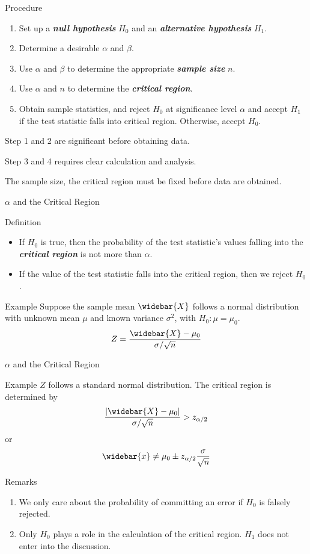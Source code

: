 \documentclass{beamer}
\newcommand{\bb}[1]{\textcolor{antiquefuchsia}{\textbf{\textit{#1}}}}
\begin{document}
\begin{frame}{Procedure}
\begin{enumerate}
\item Set up a \bb{null hypothesis} $H_{0}$ and an \bb{alternative hypothesis} $H_{1}$.
\item Determine a desirable $\alpha$ and $\beta$.
\item Use $\alpha$ and $\beta$ to determine the appropriate \bb{sample size} $n$.
\item Use $\alpha$ and $n$ to determine the \bb{critical region}.
\item Obtain sample statistics, and reject $H_{0}$ at significance level $\alpha$ and accept $H_{1}$ if the test statistic falls into critical region. Otherwise, accept $H_{0}$.
\end{enumerate}
Step 1 and 2 are significant before obtaining data.

Step 3 and 4 requires clear calculation and analysis.

The sample size, the critical region must be fixed before data are obtained.
\end{frame}

\begin{frame}{$\alpha$ and the Critical Region}
\begin{block}{Definition}
\begin{itemize}
\item If $H_{0}$ is true, then the probability of the test statistic's values falling into the \bb{critical region} is not more than $\alpha$.
\item If the value of the test statistic falls into the critical region, then we reject $H_{0}$.
\end{itemize}
\end{block}
\begin{block}{Example}
Suppose the sample mean $\widebar{X}$ follows a normal distribution with unknown mean $\mu$ and known variance $\sigma^{2}$, with $H_{0}: \mu=\mu_{0}$.
$$
Z=\frac{\widebar{X}-\mu_{0}}{\sigma / \sqrt{n}}
$$
\end{block}


\end{frame}

\begin{frame}{$\alpha$ and the Critical Region}
\begin{block}{Example}
$Z$ follows a standard normal distribution. The critical region is determined by
$$
\frac{\left|\widebar{X}-\mu_{0}\right|}{\sigma / \sqrt{n}}>z_{\alpha / 2}
$$
or
$$
\widebar{x} \neq \mu_{0} \pm z_{\alpha / 2} \frac{\sigma}{\sqrt{n}}
$$
\end{block}
\begin{block}{Remarks}
\begin{enumerate}
\item We only care about the probability of committing an error if $H_{0}$ is falsely rejected.
\item Only $H_{0}$ plays a role in the calculation of the critical region. $H_{1}$ does not enter into the discussion.
\end{enumerate}
\end{block}
\end{frame}
\end{document}
